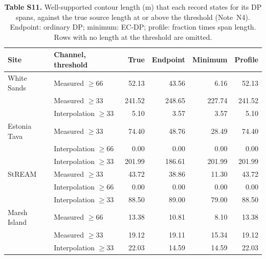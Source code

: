 \documentclass[11pt]{article}
\begin{document}
\begin{table}[!htbp]
\centering
\caption*{\textbf{Table S11.} Well-supported contour length (m) that each record states for its DP spans, against the true source length at or above the threshold (Note~N4). Endpoint: ordinary DP; minimum: EC-DP; profile: fraction times span length. Rows with no length at the threshold are omitted.}
\vspace{2mm}
\scriptsize
\setlength{\tabcolsep}{5pt}
\begin{tabular}{@{}llrrrr@{}}
\toprule
Site & Channel, threshold & True & Endpoint & Minimum & Profile \\
\midrule
White Sands & Measured $\ge66$ & 52.13 & 43.56 & 6.16 & 52.13 \\
 & Measured $\ge33$ & 241.52 & 248.65 & 227.74 & 241.52 \\
 & Interpolation $\ge33$ & 5.10 & 3.57 & 3.57 & 5.10 \\
Estonia Tava & Measured $\ge33$ & 74.40 & 48.76 & 28.49 & 74.40 \\
 & Interpolation $\ge66$ & 0.00 & 0.00 & 0.00 & 0.00 \\
 & Interpolation $\ge33$ & 201.99 & 186.61 & 201.99 & 201.99 \\
StREAM & Measured $\ge33$ & 43.72 & 38.86 & 11.30 & 43.72 \\
 & Interpolation $\ge66$ & 0.00 & 0.00 & 0.00 & 0.00 \\
 & Interpolation $\ge33$ & 88.50 & 89.00 & 79.00 & 88.50 \\
Marsh Island & Measured $\ge66$ & 13.38 & 10.81 & 8.10 & 13.38 \\
 & Measured $\ge33$ & 19.12 & 19.11 & 15.34 & 19.12 \\
 & Interpolation $\ge33$ & 22.03 & 14.59 & 14.59 & 22.03 \\
\bottomrule
\end{tabular}
\end{table}
\end{document}
